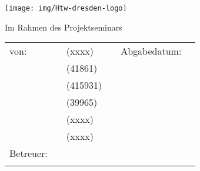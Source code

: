 \begin{titlepage}
    \thispagestyle{empty}
    \enlargethispage{35mm}
    \setlength{\headheight}{0mm}

    \sffamily



    \iftitlelogo{}
        \hspace{-1cm}\texttt{[image: img/Htw-dresden-logo]}
    \else
        {%
            \mdseries
            \Huge \MakeUppercase{\myDefUniversity}\\\vspace{0.5em}
        }
    \fi

    \vfill
    \vspace{10mm}
    \begin{center}
        \begin{huge}
            \myDefTitle{}
            \vfill
        \end{huge}
        \begin{Large}
            Im Rahmen des Projektseminars \\ 
            \myDefSeminar{}
            \vfill
        \end{Large}

    \end{center}

    \vfill
    \iftitlefinal{}
        \begin{small}
            \begin{tabularx}{\textwidth}{lllXll}
            	von: & \myDefAuthorA{} & (xxxx) & & Abgabedatum:  & \myDefDateHandIn{}\\
            	& \myDefAuthorB{} & (41861) \\
            	& \myDefAuthorC{} & (415931) \\
            	& \myDefAuthorD{} & (39965) \\
            	& \myDefAuthorE{} & (xxxx) \\
            	& \myDefAuthorF{} & (xxxx) \\
                Betreuer:    & \multicolumn{2}{l}{\myDefSupervisor{}} \\
                &  \multicolumn{2}{l}{\myDefChair{}} \\
            \end{tabularx}
        \end{small}
        \vspace{2em}
    \fi
    \vspace{3em}

    \normalsize

\end{titlepage}

